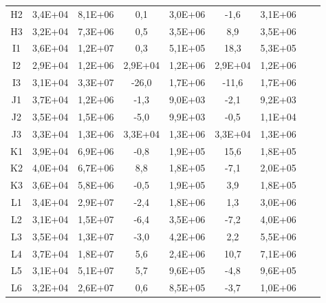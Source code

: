 \begin{center}
\begin{longtable}{ccccccccc}
    H2    & 3,4E+04 & 8,1E+06 & 0,1   & 3,0E+06 & -1,6  & 3,1E+06 \\
    H3    & 3,2E+04 & 7,3E+06 & 0,5   & 3,5E+06 & 8,9   & 3,5E+06 \\
    I1    & 3,6E+04 & 1,2E+07 & 0,3   & 5,1E+05 & 18,3  & 5,3E+05 \\
    I2    & 2,9E+04 & 1,2E+06 & 2,9E+04 & 1,2E+06 & 2,9E+04 & 1,2E+06 \\
    I3    & 3,1E+04 & 3,3E+07 & -26,0 & 1,7E+06 & -11,6 & 1,7E+06 \\
    J1    & 3,7E+04 & 1,2E+06 & -1,3  & 9,0E+03 & -2,1  & 9,2E+03 \\
    J2    & 3,5E+04 & 1,5E+06 & -5,0  & 9,9E+03 & -0,5  & 1,1E+04 \\
    J3    & 3,3E+04 & 1,3E+06 & 3,3E+04 & 1,3E+06 & 3,3E+04 & 1,3E+06 \\
    K1    & 3,9E+04 & 6,9E+06 & -0,8  & 1,9E+05 & 15,6  & 1,8E+05 \\
    K2    & 4,0E+04 & 6,7E+06 & 8,8   & 1,8E+05 & -7,1  & 2,0E+05 \\
    K3    & 3,6E+04 & 5,8E+06 & -0,5  & 1,9E+05 & 3,9   & 1,8E+05 \\
    L1    & 3,4E+04 & 2,9E+07 & -2,4  & 1,8E+06 & 1,3   & 3,0E+06 \\
    L2    & 3,1E+04 & 1,5E+07 & -6,4  & 3,5E+06 & -7,2  & 4,0E+06 \\
    L3    & 3,5E+04 & 1,3E+07 & -3,0  & 4,2E+06 & 2,2   & 5,5E+06 \\
    L4    & 3,7E+04 & 1,8E+07 & 5,6   & 2,4E+06 & 10,7  & 7,1E+06 \\
    L5    & 3,1E+04 & 5,1E+07 & 5,7   & 9,6E+05 & -4,8  & 9,6E+05 \\
    L6    & 3,2E+04 & 2,6E+07 & 0,6   & 8,5E+05 & -3,7  & 1,0E+06 \\
\end{longtable}
\end{center}

